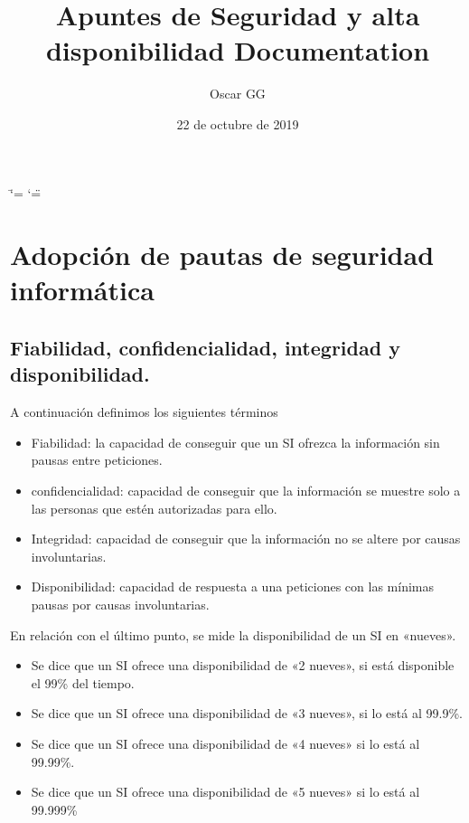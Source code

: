 \documentclass[letterpaper,10pt,spanish]{sphinxmanual}
\title{Apuntes de Seguridad y alta disponibilidad Documentation}
\date{22 de octubre de 2019}
\author{Oscar GG}
\begin{document}
\ifdefined\shorthandoff
  \ifnum\catcode`\=\string=\active\shorthandoff{=}\fi
  \ifnum\catcode`\"=\active{}\fi
\fi

\pagestyle{empty}
\maketitle
\pagestyle{plain}
\sphinxtableofcontents
\pagestyle{normal}
\label{\detokenize{index::doc}}



\chapter{Adopción de pautas de seguridad informática}
\label{\detokenize{tema_pautas_seguridad_informatica/tema_pautas_seguridad_informatica:adopcion-de-pautas-de-seguridad-informatica}}\label{\detokenize{tema_pautas_seguridad_informatica/tema_pautas_seguridad_informatica::doc}}

\section{Fiabilidad, confidencialidad, integridad y disponibilidad.}
\label{\detokenize{tema_pautas_seguridad_informatica/tema_pautas_seguridad_informatica:fiabilidad-confidencialidad-integridad-y-disponibilidad}}
A continuación definimos los siguientes términos
\begin{itemize}
\item {} 
Fiabilidad: la capacidad de conseguir que un SI ofrezca la información sin pausas entre peticiones.

\item {} 
confidencialidad: capacidad de conseguir que la información se muestre solo a las personas que estén autorizadas para ello.

\item {} 
Integridad: capacidad de conseguir que la información no se altere por causas involuntarias.

\item {} 
Disponibilidad: capacidad de respuesta a una peticiones con las mínimas pausas por causas involuntarias.

\end{itemize}

En relación con el último punto, se mide la disponibilidad de un SI en «nueves».
\begin{itemize}
\item {} 
Se dice que un SI ofrece una disponibilidad de «2 nueves», si está disponible el 99\% del tiempo.

\item {} 
Se dice que un SI ofrece una disponibilidad de «3 nueves», si lo está al 99.9\%.

\item {} 
Se dice que un SI ofrece una disponibilidad de «4 nueves» si lo está al 99.99\%.

\item {} 
Se dice que un SI ofrece una disponibilidad de «5 nueves» si lo está al 99.999\%

\end{itemize}
\end{document}
